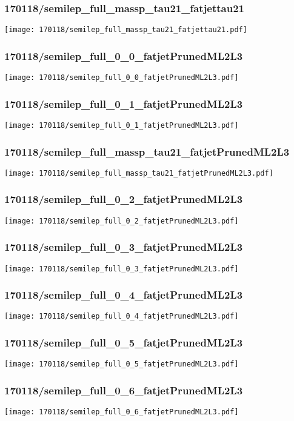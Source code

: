 \begin{frame}
   \frametitle{\small 170118/semilep\_full\_massp\_tau21\_fatjettau21}
   \centering
   \texttt{[image: 170118/semilep\_full\_massp\_tau21\_fatjettau21.pdf]}
\end{frame}

\begin{frame}
   \frametitle{\small 170118/semilep\_full\_0\_0\_fatjetPrunedML2L3}
   \centering
   \texttt{[image: 170118/semilep\_full\_0\_0\_fatjetPrunedML2L3.pdf]}
\end{frame}

\begin{frame}
   \frametitle{\small 170118/semilep\_full\_0\_1\_fatjetPrunedML2L3}
   \centering
   \texttt{[image: 170118/semilep\_full\_0\_1\_fatjetPrunedML2L3.pdf]}
\end{frame}

\begin{frame}
   \frametitle{\small 170118/semilep\_full\_massp\_tau21\_fatjetPrunedML2L3}
   \centering
   \texttt{[image: 170118/semilep\_full\_massp\_tau21\_fatjetPrunedML2L3.pdf]}
\end{frame}

\begin{frame}
   \frametitle{\small 170118/semilep\_full\_0\_2\_fatjetPrunedML2L3}
   \centering
   \texttt{[image: 170118/semilep\_full\_0\_2\_fatjetPrunedML2L3.pdf]}
\end{frame}

\begin{frame}
   \frametitle{\small 170118/semilep\_full\_0\_3\_fatjetPrunedML2L3}
   \centering
   \texttt{[image: 170118/semilep\_full\_0\_3\_fatjetPrunedML2L3.pdf]}
\end{frame}

\begin{frame}
   \frametitle{\small 170118/semilep\_full\_0\_4\_fatjetPrunedML2L3}
   \centering
   \texttt{[image: 170118/semilep\_full\_0\_4\_fatjetPrunedML2L3.pdf]}
\end{frame}

\begin{frame}
   \frametitle{\small 170118/semilep\_full\_0\_5\_fatjetPrunedML2L3}
   \centering
   \texttt{[image: 170118/semilep\_full\_0\_5\_fatjetPrunedML2L3.pdf]}
\end{frame}

\begin{frame}
   \frametitle{\small 170118/semilep\_full\_0\_6\_fatjetPrunedML2L3}
   \centering
   \texttt{[image: 170118/semilep\_full\_0\_6\_fatjetPrunedML2L3.pdf]}
\end{frame}

